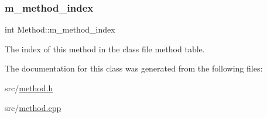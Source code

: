 \subsubsection{\texorpdfstring{m\+\_\+method\+\_\+index}{m\_method\_index}}
{\footnotesize\ttfamily int Method\+::m\+\_\+method\+\_\+index\hspace{0.3cm}{\ttfamily [private]}}



The index of this method in the class file method table. 



The documentation for this class was generated from the following files\+:\begin{DoxyCompactItemize}
\item 
src/\hyperlink{method_8h}{method.\+h}\item 
src/\hyperlink{method_8cpp}{method.\+cpp}\end{DoxyCompactItemize}
